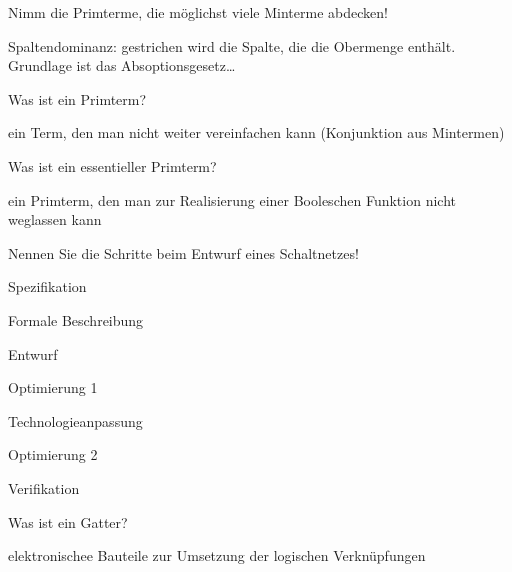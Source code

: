 \documentclass
[
  draft    = true,
  fontsize = 11pt,
  parskip  = half-,
  BCOR     = 0pt,
  DIV      = 11,
  ngerman,
  dvipsnames
]
{scrartcl}
\begin{document}
\begin{mytemize}
\begin{achim}
\begin{mytemize}
                  \glqq Nimm die Primterme, die möglichst viele Minterme abdecken!\grqq
            \item Spaltendominanz: gestrichen wird die Spalte, die die Obermenge enthält.
                  Grundlage ist das Absoptionsgesetz\ldots
          \end{mytemize}
        \end{achim}
  \item Was ist ein Primterm?
        \begin{achim}
          \begin{mytemize}
            \item ein Term, den man nicht weiter vereinfachen kann (Konjunktion aus Mintermen)
          \end{mytemize}
        \end{achim}
  \item Was ist ein essentieller Primterm?
        \begin{achim}
          \begin{mytemize}
            \item ein Primterm, den man zur Realisierung einer Booleschen Funktion nicht weglassen kann
          \end{mytemize}
        \end{achim}
  \item Nennen Sie die Schritte beim Entwurf eines Schaltnetzes!
        \begin{achim}
          \begin{mytemize}
            \item Spezifikation
            \item Formale Beschreibung
            \item Entwurf
            \item Optimierung 1
            \item Technologieanpassung
            \item Optimierung 2
            \item Verifikation
          \end{mytemize}
        \end{achim}
  \item Was ist ein Gatter?
        \begin{achim}
          \begin{mytemize}
            \item elektronischee Bauteile zur Umsetzung der logischen Verknüpfungen
          \end{mytemize}
        \end{achim}

\end{mytemize}
\end{document}
